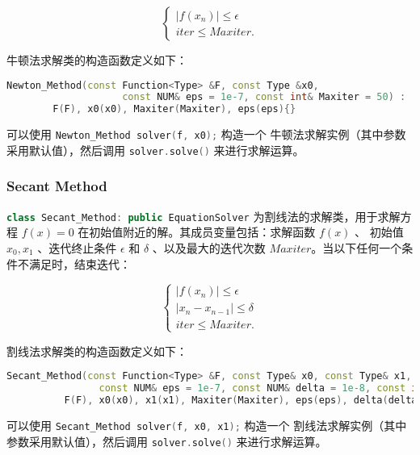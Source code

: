 \documentclass[lang=cn,a4paper,newtx,bibend=bibtex]{elegantpaper}
\begin{document}
\begin{equation*}
  \begin{cases}
    \vert f(x_n)\vert \le \epsilon \\
    iter \le Maxiter.
  \end{cases}
\end{equation*}

牛顿法求解类的构造函数定义如下：

\begin{lstlisting}[language=C++]
  Newton_Method(const Function<Type> &F, const Type &x0, 
                    const NUM& eps = 1e-7, const int& Maxiter = 50) :
        F(F), x0(x0), Maxiter(Maxiter), eps(eps){}
\end{lstlisting}

可以使用 \lstinline[language=C++]{Newton_Method solver(f, x0);} 构造一个
牛顿法求解实例（其中参数采用默认值），然后调用 \lstinline[language=C++]{solver.solve()} 来进行求解运算。 

\subsubsection{Secant Method}

\lstinline[language=C++]{class Secant_Method: public EquationSolver}
为割线法的求解类，用于求解方程 $f(x) = 0$ 在初始值附近的解。其成员变量包括：求解函数 $f(x)$ 、
初始值 $x_0,x_1$ 、迭代终止条件 $\epsilon$ 和 $\delta$ 、以及最大的迭代次数
$Maxiter$。当以下任何一个条件不满足时，结束迭代：

\begin{equation*}
  \begin{cases}
    \vert f(x_n)\vert \le \epsilon \\
    \vert x_n - x_{n-1} \vert \le \delta \\
    iter \le Maxiter.
  \end{cases}
\end{equation*}

割线法求解类的构造函数定义如下：

\begin{lstlisting}[language=C++]
  Secant_Method(const Function<Type> &F, const Type& x0, const Type& x1,
                const NUM& eps = 1e-7, const NUM& delta = 1e-8, const int& Maxiter = 50) :
          F(F), x0(x0), x1(x1), Maxiter(Maxiter), eps(eps), delta(delta){}
\end{lstlisting}

可以使用 \lstinline[language=C++]{Secant_Method solver(f, x0, x1);} 构造一个
割线法求解实例（其中参数采用默认值），然后调用 \lstinline[language=C++]{solver.solve()} 来进行求解运算。 
\end{document}
